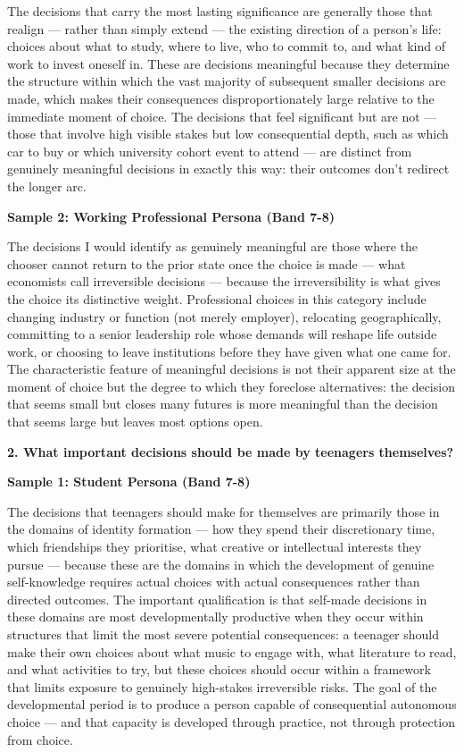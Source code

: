 The decisions that carry the most lasting significance are generally those that realign — rather than simply extend — the existing direction of a person's life: choices about what to study, where to live, who to commit to, and what kind of work to invest oneself in. These are decisions meaningful because they determine the structure within which the vast majority of subsequent smaller decisions are made, which makes their consequences disproportionately large relative to the immediate moment of choice. The decisions that feel significant but are not — those that involve high visible stakes but low consequential depth, such as which car to buy or which university cohort event to attend — are distinct from genuinely meaningful decisions in exactly this way: their outcomes don't redirect the longer arc.

\textbf{Sample 2: Working Professional Persona (Band 7-8)}

The decisions I would identify as genuinely meaningful are those where the chooser cannot return to the prior state once the choice is made — what economists call irreversible decisions — because the irreversibility is what gives the choice its distinctive weight. Professional choices in this category include changing industry or function (not merely employer), relocating geographically, committing to a senior leadership role whose demands will reshape life outside work, or choosing to leave institutions before they have given what one came for. The characteristic feature of meaningful decisions is not their apparent size at the moment of choice but the degree to which they foreclose alternatives: the decision that seems small but closes many futures is more meaningful than the decision that seems large but leaves most options open.

\separator

\begin{ieltsquestion}
\textbf{2. What important decisions should be made by teenagers themselves?}
\end{ieltsquestion}
\textbf{Sample 1: Student Persona (Band 7-8)}

The decisions that teenagers should make for themselves are primarily those in the domains of identity formation — how they spend their discretionary time, which friendships they prioritise, what creative or intellectual interests they pursue — because these are the domains in which the development of genuine self-knowledge requires actual choices with actual consequences rather than directed outcomes. The important qualification is that self-made decisions in these domains are most developmentally productive when they occur within structures that limit the most severe potential consequences: a teenager should make their own choices about what music to engage with, what literature to read, and what activities to try, but these choices should occur within a framework that limits exposure to genuinely high-stakes irreversible risks. The goal of the developmental period is to produce a person capable of consequential autonomous choice — and that capacity is developed through practice, not through protection from choice.

